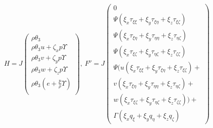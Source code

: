 \begin{equation}
\nonumber
H=J
\begin{pmatrix}
\rho \theta_3
\\
\rho \theta_3 u +\zeta_x p \Upsilon
\\
\rho \theta_3 v +\zeta_y p \Upsilon
\\
\rho \theta_3 w +\zeta_z p \Upsilon
\\
\rho \theta_3 \left( e+\frac{p}{\rho} \Upsilon\right)
\\
\end{pmatrix}
,\ 
F^\nu=J
\begin{pmatrix}
0
\\
\Psi \left(\xi_x \tau_{\xi \xi}+\xi_y \tau_{\xi \eta}+\xi_z \tau_{\xi \zeta}\right)
\\
\Psi \left(\xi_x \tau_{\xi \eta}+\xi_y \tau_{\eta \eta}+\xi_z \tau_{\eta \zeta}\right)
\\
\Psi \left(\xi_x \tau_{\xi \zeta}+\xi_y \tau_{\eta \zeta}+\xi_z \tau_{\zeta \zeta}\right)
\\
\Psi (
u\left(\xi_x \tau_{\xi \xi} + \xi_y \tau_{\xi \eta} + \xi_z \tau_{\xi \zeta}\right)+ \\
v\left(\xi_x \tau_{\xi \eta} + \xi_y \tau_{\eta \eta} + \xi_z \tau_{\eta \zeta}\right)+ \\
w\left(\xi_x \tau_{\xi \zeta} + \xi_y \tau_{\eta \zeta} + \xi_z \tau_{\zeta \zeta}\right))+ \\
\Gamma \left(
\xi_x q_\xi+\xi_y q_\eta+\xi_z q_\zeta
\right)
\end{pmatrix}
\label{eq2}
\end{equation}
